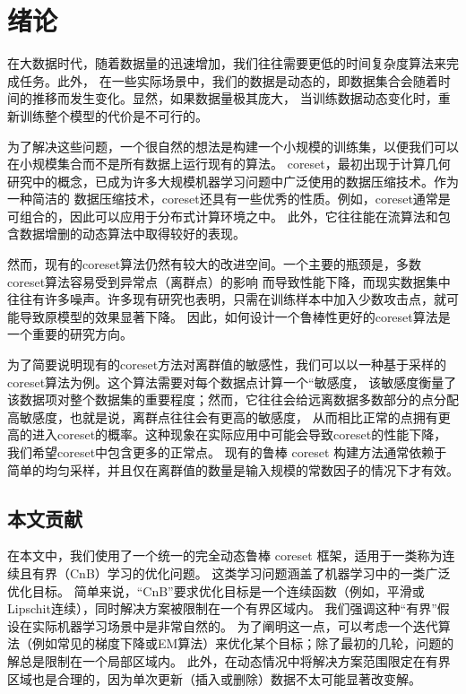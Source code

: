 
\chapter{绪论}

在大数据时代，随着数据量的迅速增加，我们往往需要更低的时间复杂度算法来完成任务。此外，
在一些实际场景中，我们的数据是动态的，即数据集合会随着时间的推移而发生变化。显然，如果数据量极其庞大，
当训练数据动态变化时，重新训练整个模型的代价是不可行的。

为了解决这些问题，一个很自然的想法是构建一个小规模的训练集，以便我们可以在小规模集合而不是所有数据上运行现有的算法。
coreset，最初出现于计算几何研究中的概念，已成为许多大规模机器学习问题中广泛使用的数据压缩技术。作为一种简洁的
数据压缩技术，coreset还具有一些优秀的性质。例如，coreset通常是可组合的，因此可以应用于分布式计算环境之中。
此外，它往往能在流算法和包含数据增删的动态算法中取得较好的表现。

然而，现有的coreset算法仍然有较大的改进空间。一个主要的瓶颈是，多数coreset算法容易受到异常点（离群点）的影响
而导致性能下降，而现实数据集中往往有许多噪声。许多现有研究也表明，只需在训练样本中加入少数攻击点，就可能导致原模型的效果显著下降。
因此，如何设计一个鲁棒性更好的coreset算法是一个重要的研究方向。

为了简要说明现有的coreset方法对离群值的敏感性，我们可以以一种基于采样的coreset算法为例。这个算法需要对每个数据点计算一个“敏感度，
该敏感度衡量了该数据项对整个数据集的重要程度；然而，它往往会给远离数据多数部分的点分配高敏感度，也就是说，离群点往往会有更高的敏感度，
从而相比正常的点拥有更高的进入coreset的概率。这种现象在实际应用中可能会导致coreset的性能下降，我们希望coreset中包含更多的正常点。
现有的鲁棒 coreset 构建方法通常依赖于简单的均匀采样，并且仅在离群值的数量是输入规模的常数因子的情况下才有效。


\section{本文贡献}

在本文中，我们使用了一个统一的完全动态鲁棒 coreset 框架，适用于一类称为连续且有界（CnB）学习的优化问题。
这类学习问题涵盖了机器学习中的一类广泛优化目标。
简单来说，“CnB”要求优化目标是一个连续函数（例如，平滑或Lipschit连续），同时解决方案被限制在一个有界区域内。
我们强调这种“有界”假设在实际机器学习场景中是非常自然的。
为了阐明这一点，可以考虑一个迭代算法（例如常见的梯度下降或EM算法）来优化某个目标；除了最初的几轮，问题的解总是限制在一个局部区域内。
此外，在动态情况中将解决方案范围限定在有界区域也是合理的，因为单次更新（插入或删除）数据不太可能显著改变解。

